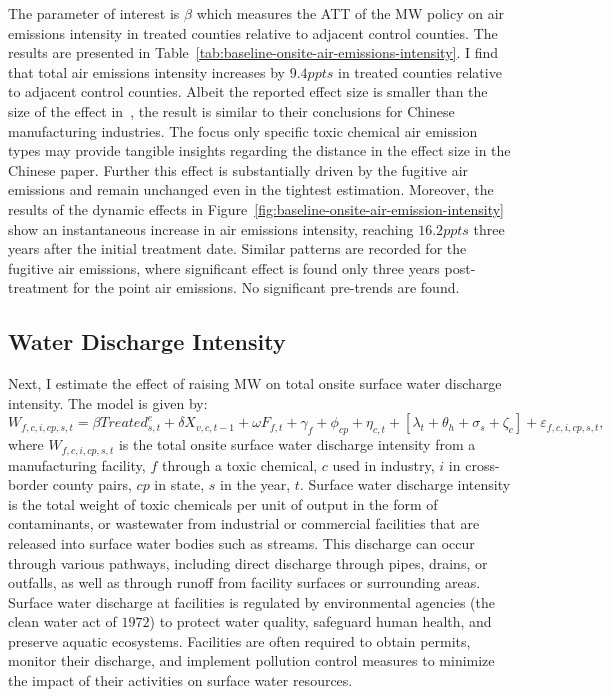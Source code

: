 \documentclass[12pt, english]{article}
\begin{document}
    The parameter of interest is $\beta$ which measures the ATT of the MW policy on air emissions intensity in treated counties relative to adjacent control counties. The results are presented in Table~\ref{tab:baseline-onsite-air-emissions-intensity}. I find that total air emissions intensity increases by $9.4ppts$ in treated counties relative to adjacent control counties. Albeit the reported effect size is smaller than the size of the effect in~\cite{zhang2023unintended}, the result is similar to their conclusions for Chinese manufacturing industries. The focus only specific toxic chemical air emission types may provide tangible insights regarding the distance in the effect size in the Chinese paper. Further this effect is substantially driven by the fugitive air emissions and remain unchanged even in the tightest estimation. Moreover, the results of the dynamic effects in Figure~\ref{fig:baseline-onsite-air-emission-intensity} show an instantaneous increase in air emissions intensity, reaching $16.2ppts$ three years after the initial treatment date. Similar patterns are recorded for the fugitive air emissions, where significant effect is found only three years post-treatment for the point air emissions. No significant pre-trends are found.
    

    \subsection{Water Discharge Intensity}\label{subsec:water-discharge-intensity}
    Next, I estimate the effect of raising MW on total onsite surface water discharge intensity. The model is given by:
    \begin{equation}
        W_{f,c,i,cp,s,t} = \beta Treated_{s,t}^e + \delta X_{v,c,t-1} + \omega F_{f,t} + \gamma_{f} + \phi_{cp} + \eta_{c,t} + \left[\lambda_{t} + \theta_{h} + \sigma_{s} + \zeta_{c} \right] + \varepsilon_{f,c,i,cp,s,t},\label{eq:baseline-onsite-water-discharge-intensity}
    \end{equation}
    where $W_{f,c,i,cp,s,t}$ is the total onsite surface water discharge intensity from a manufacturing facility, $f$ through a toxic chemical, $c$ used in industry, $i$ in cross-border county pairs, $cp$ in state, $s$ in the year, $t$. Surface water discharge intensity is the total weight of toxic chemicals per unit of output in the form of contaminants, or wastewater from industrial or commercial facilities that are released into surface water bodies such as streams. This discharge can occur through various pathways, including direct discharge through pipes, drains, or outfalls, as well as through runoff from facility surfaces or surrounding areas. Surface water discharge at facilities is regulated by environmental agencies (the clean water act of $1972$) to protect water quality, safeguard human health, and preserve aquatic ecosystems. Facilities are often required to obtain permits, monitor their discharge, and implement pollution control measures to minimize the impact of their activities on surface water resources.
    
\end{document}
